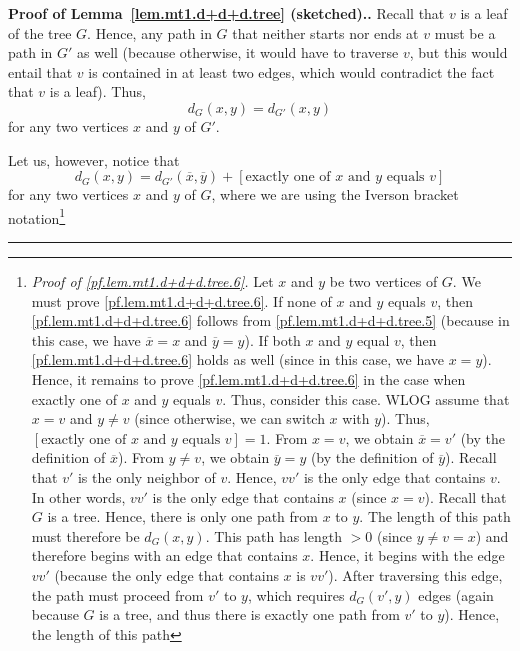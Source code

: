 \documentclass[numbers=enddot,12pt,final,onecolumn,notitlepage]{scrartcl}%
\theoremstyle{definition}
\newenvironment{proof}[1][Proof]{\noindent\textbf{#1.} }{\ \rule{0.5em}{0.5em}}
\newcommand{\tup}[1]{\left( #1 \right)}
\newcommand{\ive}[1]{\left[ #1 \right]}
\begin{document}
\begin{proof}[Proof of Lemma~\ref{lem.mt1.d+d+d.tree} (sketched).]
Recall that $v$ is a leaf of the tree $G$. Hence, any path in $G$ that
neither starts nor ends at $v$ must be a path in $G'$ as well (because
otherwise, it would have to traverse $v$, but this would entail that
$v$ is contained in at least two edges, which would contradict the
fact that $v$ is a leaf). Thus,
\begin{equation}
d_G \tup{x, y}
= d_{G'} \tup{x, y}
\label{pf.lem.mt1.d+d+d.tree.5}
\end{equation}
for any two vertices $x$ and $y$ of $G'$.

Let us, however, notice that
\begin{equation}
d_G \tup{x, y}
= d_{G'} \tup{\overline{x}, \overline{y}}
  + \ive{\text{exactly one of } x \text{ and } y
         \text{ equals } v }
\label{pf.lem.mt1.d+d+d.tree.6}
\end{equation}
for any two vertices $x$ and $y$ of $G$, where we are using the
Iverson bracket notation\footnote{\textit{Proof
of \eqref{pf.lem.mt1.d+d+d.tree.6}.} Let $x$ and $y$ be two vertices
of $G$.
We must prove \eqref{pf.lem.mt1.d+d+d.tree.6}.
If none of $x$ and $y$ equals $v$, then
\eqref{pf.lem.mt1.d+d+d.tree.6} follows from
\eqref{pf.lem.mt1.d+d+d.tree.5} (because in this case, we have
$\overline{x} = x$ and $\overline{y} = y$).
If both $x$ and $y$ equal $v$, then \eqref{pf.lem.mt1.d+d+d.tree.6}
holds as well (since in this case, we have $x = y$).
Hence, it remains to prove \eqref{pf.lem.mt1.d+d+d.tree.6} in the case
when exactly one of $x$ and $y$ equals $v$.
Thus, consider this case.
WLOG assume that $x = v$ and $y \neq v$ (since otherwise, we can
switch $x$ with $y$). Thus,
$\ive{\text{exactly one of } x \text{ and } y
         \text{ equals } v } = 1$.
From $x = v$, we obtain $\overline{x} = v'$
(by the definition of $\overline{x}$).
From $y \neq v$, we obtain $\overline{y} = y$
(by the definition of $\overline{y}$).
Recall that $v'$ is the only neighbor of $v$.
Hence, $vv'$ is the only edge that contains $v$.
In other words, $vv'$ is the only edge that contains $x$ (since
$x = v$).
Recall that $G$ is a tree. Hence, there is only one path from $x$ to
$y$. The length of this path must therefore be $d_G \tup{x, y}$. This
path has length $> 0$ (since $y \neq v = x$) and therefore begins with
an edge that contains $x$. Hence, it begins with the edge $vv'$
(because the only edge that contains $x$ is $vv'$). After traversing
this edge, the path must proceed from $v'$ to $y$, which requires
$d_G \tup{v', y}$ edges (again because $G$ is a tree, and thus there
is exactly one path from $v'$ to $y$). Hence, the length of this path
}
\end{proof}
\end{document}
